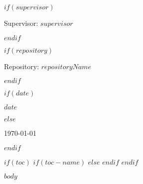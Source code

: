 \documentclass[12pt,a4paper]{article}
\begin{document}
\begin{titlepage}
    $if(supervisor)$
      \vspace{0.5cm}
      {\small Supervisor: \textit{$supervisor$}\par}
    $endif$

    $if(repository)$
      \vspace{0.5cm}
      {\small Repository: \href{$repository$}{$repositoryName$}\par}
    $endif$

    \vfill

    $if(date)$
      {\large $date$\par}
    $else$
      {\large \today\par}
    $endif$

\end{titlepage}


$if(toc)$
{
  \clearpage
  \pagestyle{plain} %
  $if(toc-name)$
    \renewcommand{\contentsname}{\centering $toc-name$} %
  $else$
    \renewcommand{\contentsname}{\centering Table of Contents} %
  $endif$
  \tableofcontents
  \clearpage
  \pagestyle{fancy} %
}
$endif$

$body$
\end{document}
